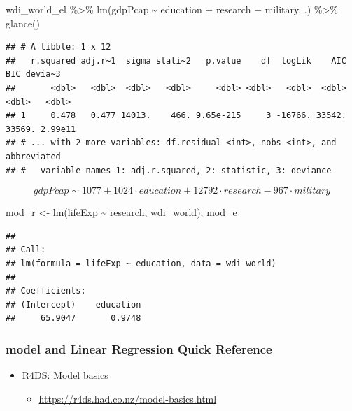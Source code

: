 \documentclass[
]{article}
\newenvironment{Shaded}{\begin{snugshade}}{\end{snugshade}}
\newcommand{\FunctionTok}[1]{\textcolor[rgb]{0.00,0.00,0.00}{#1}}
\newcommand{\NormalTok}[1]{#1}
\newcommand{\OtherTok}[1]{\textcolor[rgb]{0.56,0.35,0.01}{#1}}
\newcommand{\SpecialCharTok}[1]{\textcolor[rgb]{0.00,0.00,0.00}{#1}}
\providecommand{\tightlist}{%
  \setlength{\itemsep}{0pt}\setlength{\parskip}{0pt}}
\begin{document}
\begin{Shaded}
\begin{Highlighting}[]
\NormalTok{wdi\_world\_el }\SpecialCharTok{\%\textgreater{}\%} \FunctionTok{lm}\NormalTok{(gdpPcap }\SpecialCharTok{\textasciitilde{}}\NormalTok{ education }\SpecialCharTok{+}\NormalTok{ research }\SpecialCharTok{+}\NormalTok{ military, .) }\SpecialCharTok{\%\textgreater{}\%} \FunctionTok{glance}\NormalTok{()}
\end{Highlighting}
\end{Shaded}

\begin{verbatim}
## # A tibble: 1 x 12
##   r.squared adj.r~1  sigma stati~2   p.value    df  logLik    AIC    BIC devia~3
##       <dbl>   <dbl>  <dbl>   <dbl>     <dbl> <dbl>   <dbl>  <dbl>  <dbl>   <dbl>
## 1     0.478   0.477 14013.    466. 9.65e-215     3 -16766. 33542. 33569. 2.99e11
## # ... with 2 more variables: df.residual <int>, nobs <int>, and abbreviated
## #   variable names 1: adj.r.squared, 2: statistic, 3: deviance
\end{verbatim}

\[gdpPcap \sim 1077 + 1024\cdot education + 12792 \cdot research - 967 \cdot military\]

\begin{Shaded}
\begin{Highlighting}[]
\NormalTok{mod\_r }\OtherTok{\textless{}{-}} \FunctionTok{lm}\NormalTok{(lifeExp }\SpecialCharTok{\textasciitilde{}}\NormalTok{ research, wdi\_world); mod\_e}
\end{Highlighting}
\end{Shaded}

\begin{verbatim}
## 
## Call:
## lm(formula = lifeExp ~ education, data = wdi_world)
## 
## Coefficients:
## (Intercept)    education  
##     65.9047       0.9748
\end{verbatim}

\hypertarget{model-and-linear-regression-quick-reference}{%
\subsubsection{model and Linear Regression Quick
Reference}\label{model-and-linear-regression-quick-reference}}

\begin{itemize}
\tightlist
\item
  R4DS: Model basics

  \begin{itemize}
  \tightlist
  \item
    \url{https://r4ds.had.co.nz/model-basics.html}
  \end{itemize}
\end{itemize}
\end{document}
